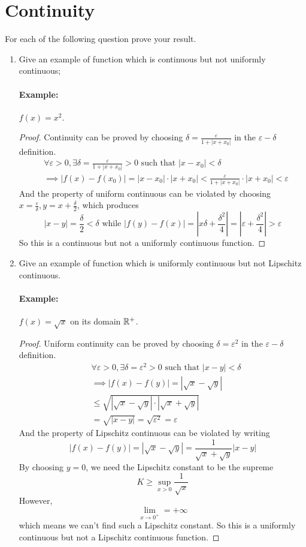 \section{Continuity}
For each of the following question prove your result.
\begin{enumerate}
	\item Give an example of function which is continuous but not uniformly continuous;
    \paragraph{Example:} \(f(x)=x^2\).
    \begin{proof}
    Continuity can be proved by choosing \(\delta=\frac{\varepsilon}{1+|x+x_0|}\) in the \(\varepsilon-\delta\) definition.
    \begin{align*}
    	&\forall\varepsilon>0,\exists\delta=\frac{\varepsilon}{1+|x+x_0|}>0\textrm{ such that } |x-x_0|<\delta\\
        &\implies |f(x)-f(x_0)|=|x-x_0|\cdot|x+x_0|<\frac{\varepsilon}{1+|x+x_0|}\cdot|x+x_0|<\varepsilon
    \end{align*}
	And the property of uniform continuous can be violated by choosing \(x=\frac{\varepsilon}{\delta},y=x+\frac{\delta}{2}\), which produces
	\[ |x-y|=\frac{\delta}{2}<\delta \textrm{ while } |f(y)-f(x)|=\left|x\delta+\frac{\delta^2}{4}\right|=\left|\varepsilon+\frac{\delta^2}{4}\right|>\varepsilon \]
	So this is a continuous but not a uniformly continuous function.
    \end{proof}
	\item Give an example of function which is uniformly continuous but not Lipschitz continuous.
	\paragraph{Example:} \(f(x)=\sqrt{x}\) on its domain $\mathbb{R}^+$.
	\begin{proof}
    Uniform continuity can be proved by choosing \(\delta=\varepsilon^2\) in the \(\varepsilon-\delta\) definition.
    \begin{align*}
    	&\forall\varepsilon>0,\exists\delta=\varepsilon^2>0\textrm{ such that } |x-y|<\delta\\
        &\implies |f(x)-f(y)|=|\sqrt{x}-\sqrt{y}|\\
        &\leq \sqrt{|\sqrt{x}-\sqrt{y}|\cdot|\sqrt{x}+\sqrt{y}|}\\
        &=\sqrt{|x-y|}=\sqrt{\varepsilon^2}=\varepsilon
    \end{align*}
	And the property of Lipschitz continuous can be violated by writing
	\[ |f(x)-f(y)|=|\sqrt{x}-\sqrt{y}|=\frac{1}{\sqrt{x}+\sqrt{y}}|x-y| \]
	By choosing \(y=0\), we need the Lipschitz constant to be the supreme 
	\[ K\geq \sup_{x>0}\frac{1}{\sqrt{x}} \]
	However, 
	\[ \lim_{x\to0^+}=+\infty \]
	which means we can't find such a Lipschitz constant.
	So this is a uniformly continuous but not a Lipschitz continuous function.
    \end{proof}
\end{enumerate}


